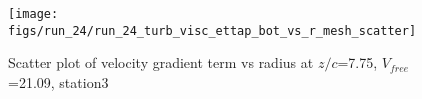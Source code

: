 \begin{figure}[H]
\centering
\texttt{[image: figs/run\_24/run\_24\_turb\_visc\_ettap\_bot\_vs\_r\_mesh\_scatter]}
\caption{Scatter plot of velocity gradient term vs radius at $z/c$=7.75, $V_{free}$=21.09, station3}
\label{fig:run_24_turb_visc_ettap_bot_vs_r_mesh_scatter}
\end{figure}


